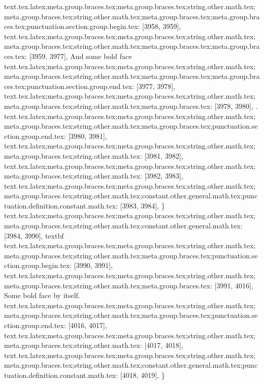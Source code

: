 {{{{{{{{{{{{{{{{{{{{{{{{{{{{{{{{{{{{{{{{{{{{{{{{{{{{{{{{{{{{{{{{{{{{{{{{{{{{{{{{{{{{{{{{{{{{{{{{{{{{{{{{{{{{{{{{{{{{{{{{{{{{{{{text.tex.latex;meta.group.braces.tex;meta.group.braces.tex;string.other.math.tex;meta.group.braces.tex;string.other.math.tex;meta.group.braces.tex;meta.group.braces.tex;punctuation.section.group.begin.tex: [3958, 3959], {{}
text.tex.latex;meta.group.braces.tex;meta.group.braces.tex;string.other.math.tex;meta.group.braces.tex;string.other.math.tex;meta.group.braces.tex;meta.group.braces.tex: [3959, 3977], {And some bold face}
text.tex.latex;meta.group.braces.tex;meta.group.braces.tex;string.other.math.tex;meta.group.braces.tex;string.other.math.tex;meta.group.braces.tex;meta.group.braces.tex;punctuation.section.group.end.tex: [3977, 3978], {}}
text.tex.latex;meta.group.braces.tex;meta.group.braces.tex;string.other.math.tex;meta.group.braces.tex;string.other.math.tex;meta.group.braces.tex: [3978, 3980], {.
}
text.tex.latex;meta.group.braces.tex;meta.group.braces.tex;string.other.math.tex;meta.group.braces.tex;string.other.math.tex;meta.group.braces.tex;punctuation.section.group.end.tex: [3980, 3981], {}}
text.tex.latex;meta.group.braces.tex;meta.group.braces.tex;string.other.math.tex;meta.group.braces.tex;string.other.math.tex: [3981, 3982], {
}
text.tex.latex;meta.group.braces.tex;meta.group.braces.tex;string.other.math.tex;meta.group.braces.tex;string.other.math.tex: [3982, 3983], {
}
text.tex.latex;meta.group.braces.tex;meta.group.braces.tex;string.other.math.tex;meta.group.braces.tex;string.other.math.tex;constant.other.general.math.tex;punctuation.definition.constant.math.tex: [3983, 3984], {\}
text.tex.latex;meta.group.braces.tex;meta.group.braces.tex;string.other.math.tex;meta.group.braces.tex;string.other.math.tex;constant.other.general.math.tex: [3984, 3990], {textbf}
text.tex.latex;meta.group.braces.tex;meta.group.braces.tex;string.other.math.tex;meta.group.braces.tex;string.other.math.tex;meta.group.braces.tex;punctuation.section.group.begin.tex: [3990, 3991], {{}
text.tex.latex;meta.group.braces.tex;meta.group.braces.tex;string.other.math.tex;meta.group.braces.tex;string.other.math.tex;meta.group.braces.tex: [3991, 4016], {Some bold face by itself.}
text.tex.latex;meta.group.braces.tex;meta.group.braces.tex;string.other.math.tex;meta.group.braces.tex;string.other.math.tex;meta.group.braces.tex;punctuation.section.group.end.tex: [4016, 4017], {}}
text.tex.latex;meta.group.braces.tex;meta.group.braces.tex;string.other.math.tex;meta.group.braces.tex;string.other.math.tex: [4017, 4018], {
}
text.tex.latex;meta.group.braces.tex;meta.group.braces.tex;string.other.math.tex;meta.group.braces.tex;string.other.math.tex;constant.other.general.math.tex;punctuation.definition.constant.math.tex: [4018, 4019], {\}
}}}}}}}}}}}}}}}}}}}}}}}}}}}}}}}}}}}}}}}}}}}}}}}}}}}}}}}}}}}}}}}}}}}}}}}}}}}}}}}}}}}}}}}}}}}}}}}}}}}}}}}}}}}}}}}}}}}}}}}}}}}}}}}}
